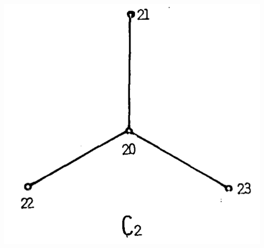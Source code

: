 \documentclass[11pt]{amsbook}
\begin{document}
    \includegraphics[scale = 0.7]{images/ceyhun-069_fig2}
  
\end{document}
